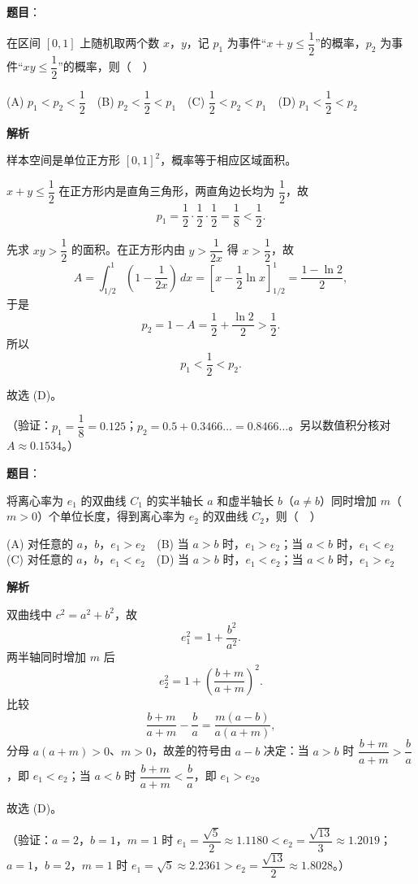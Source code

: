 \begin{answer}

\textbf{题目}：

在区间 \([0,1]\) 上随机取两个数 \(x\)，\(y\)，记 \(p_1\) 为事件“\(x+y\leqslant\dfrac12\)”的概率，\(p_2\) 为事件“\(xy\leqslant\dfrac12\)”的概率，则（　）

(A) \(p_1<p_2<\dfrac12\)　(B) \(p_2<\dfrac12<p_1\)　(C) \(\dfrac12<p_2<p_1\)　(D) \(p_1<\dfrac12<p_2\)

\textbf{解析}

样本空间是单位正方形 \([0,1]^2\)，概率等于相应区域面积。

\(x+y\leqslant\dfrac12\) 在正方形内是直角三角形，两直角边长均为 \(\dfrac12\)，故
\nopagebreak[4]
\[
p_1=\frac12\cdot\frac12\cdot\frac12=\frac18<\frac12.
\]

先求 \(xy>\dfrac12\) 的面积。在正方形内由 \(y>\dfrac{1}{2x}\) 得 \(x>\dfrac12\)，故
\nopagebreak[4]
\[
A=\int_{1/2}^{1}\left(1-\frac{1}{2x}\right)\,dx
=\left[x-\frac12\ln x\right]_{1/2}^{1}
=\frac{1-\ln2}{2},
\]
于是
\nopagebreak[4]
\[
p_2=1-A=\frac12+\frac{\ln2}{2}>\frac12.
\]
所以
\nopagebreak[4]
\[
p_1<\frac12<p_2.
\]

故选 (D)。

（验证：\(p_1=\dfrac18=0.125\)；\(p_2=0.5+0.3466\ldots=0.8466\ldots\)。另以数值积分核对 \(A\approx0.1534\)。）


\end{answer}
\begin{answer}

\textbf{题目}：

将离心率为 \(e_1\) 的双曲线 \(C_1\) 的实半轴长 \(a\) 和虚半轴长 \(b\)（\(a\neq b\)）同时增加 \(m\)（\(m>0\)）个单位长度，得到离心率为 \(e_2\) 的双曲线 \(C_2\)，则（　）

(A) 对任意的 \(a\)，\(b\)，\(e_1>e_2\)　(B) 当 \(a>b\) 时，\(e_1>e_2\)；当 \(a<b\) 时，\(e_1<e_2\)　(C) 对任意的 \(a\)，\(b\)，\(e_1<e_2\)　(D) 当 \(a>b\) 时，\(e_1<e_2\)；当 \(a<b\) 时，\(e_1>e_2\)

\textbf{解析}

双曲线中 \(c^2=a^2+b^2\)，故
\nopagebreak[4]
\[
e_1^2=1+\frac{b^2}{a^2}.
\]
两半轴同时增加 \(m\) 后
\nopagebreak[4]
\[
e_2^2=1+\left(\frac{b+m}{a+m}\right)^2.
\]
比较
\nopagebreak[4]
\[
\frac{b+m}{a+m}-\frac ba=\frac{m(a-b)}{a(a+m)},
\]
分母 \(a(a+m)>0\)、\(m>0\)，故差的符号由 \(a-b\) 决定：当 \(a>b\) 时 \(\dfrac{b+m}{a+m}>\dfrac ba\)，即 \(e_1<e_2\)；当 \(a<b\) 时 \(\dfrac{b+m}{a+m}<\dfrac ba\)，即 \(e_1>e_2\)。

故选 (D)。

（验证：\(a=2\)，\(b=1\)，\(m=1\) 时 \(e_1=\dfrac{\sqrt5}{2}\approx1.1180<e_2=\dfrac{\sqrt{13}}{3}\approx1.2019\)；\(a=1\)，\(b=2\)，\(m=1\) 时 \(e_1=\sqrt5\approx2.2361>e_2=\dfrac{\sqrt{13}}{2}\approx1.8028\)。）


\end{answer}
